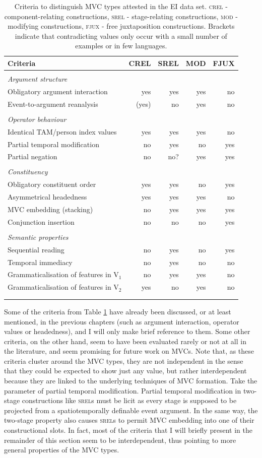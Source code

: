 \begin{table}
\begin{tabular}{lrrrr}
\lsptoprule
Criteria&CREL&SREL&MOD&FJUX\tabularnewline
\hline
\tabularnewline
\textit{Argument structure}& & & & \tabularnewline
Obligatory argument interaction&yes&yes&yes&no\tabularnewline
Event-to-argument reanalysis&(yes)&no&yes&no\tabularnewline\tabularnewline
\textit{Operator behaviour}& & & & \tabularnewline
Identical TAM/person index values&yes&yes&yes&no\tabularnewline
Partial temporal modification&no&yes&no&yes\tabularnewline
Partial negation&no&no?&yes&yes\tabularnewline\tabularnewline
\textit{Constituency}& & & & \tabularnewline
Obligatory constituent order&yes&yes&no&yes\tabularnewline
Asymmetrical headedness&yes&yes&yes&no\tabularnewline
MVC embedding (stacking)&no&yes&yes&yes\tabularnewline
Conjunction insertion&no&no&no&yes\tabularnewline\tabularnewline
\textit{Semantic properties}& & & & \tabularnewline
Sequential reading&no&yes&no&yes\tabularnewline
Temporal immediacy&no&yes&no&no\tabularnewline
Grammaticalisation of features in V$_1$&no&yes&yes&no\tabularnewline
Grammaticalisation of features in V$_2$&yes&no&yes&no\tabularnewline
\tabularnewline
\lspbottomrule
\end{tabular}
\caption[Criteria to distinguish MVC types]{Criteria to distinguish MVC types attested in the EI data set. \textsc{crel} - component-relating constructions, \textsc{srel} - stage-relating constructions, \textsc{mod} - modifying constructions, \textsc{fjux} - free juxtaposition constructions. Brackets indicate that contradicting values only occur with a small number of examples or in few languages.}
\label{table:criteriaconstruction}
\end{table}

Some of the criteria from Table \ref{table:criteriaconstruction} have already been discussed, or at least mentioned, in the previous chapters (such as argument interaction, operator values or headedness), and I will only make brief reference to them. Some other criteria, on the other hand, seem to have been evaluated rarely or not at all in the literature, and seem promising for future work on MVCs. Note that, as these criteria cluster around the MVC types, they are not independent in the sense that they could be expected to show just any value, but rather interdependent because they are linked to the underlying techniques of MVC formation. Take the parameter of partial temporal modification. Partial temporal modification in two-stage constructions like \textsc{srel}s must be licit as every stage is supposed to be projected from a spatiotemporally definable event argument. In the same way, the two-stage property also causes \textsc{srel}s to permit MVC embedding into one of their constructional slots. In fact, most of the criteria that I will briefly present in the remainder of this section seem to be interdependent, thus pointing to more general properties of the MVC types.

